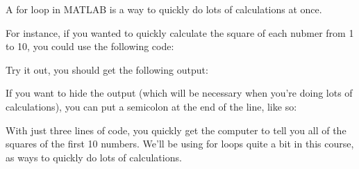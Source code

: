 \documentclass{ximera}
\begin{document}
\begin{exploration}
\begin{remark}
\end{remark}


  
  \begin{hint}
      
      A for loop in MATLAB is a way to quickly do lots of calculations at once.

  For instance, if you wanted to quickly calculate the square of each nubmer from 1 to 10, you could use the following code:



  Try it out, you should get the following output:


  If you want to hide the output (which will be necessary when you're doing lots of calculations), you can put a semicolon at the end of the line, like so:



  With just three lines of code, you quickly get the computer to tell you all of the squares of the first 10 numbers. We'll be using for loops quite a bit in this course, as ways to quickly do lots of calculations. 
  \end{hint}
\end{exploration}
\end{document}
